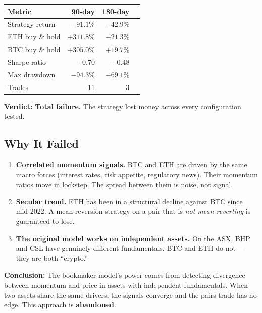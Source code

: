 \documentclass[11pt,a4paper]{article}
\begin{document}
\begin{tabular}{@{}lrrr@{}}
    \toprule
    \textbf{Metric} & \textbf{90-day} & \textbf{180-day} \\
    \midrule
    Strategy return    & $-91.1\%$  & $-42.9\%$  \\
    ETH buy \& hold    & $+311.8\%$ & $-21.3\%$  \\
    BTC buy \& hold    & $+305.0\%$ & $+19.7\%$  \\
    Sharpe ratio       & $-0.70$    & $-0.48$    \\
    Max drawdown       & $-94.3\%$  & $-69.1\%$  \\
    Trades             & 11         & 3          \\
    \bottomrule
\end{tabular}

\vspace{0.5em}

\textbf{Verdict: Total failure.} The strategy lost money across every
configuration tested.

\subsection{Why It Failed}

\begin{enumerate}[leftmargin=2em]
    \item \textbf{Correlated momentum signals.} BTC and ETH are driven
          by the same macro forces (interest rates, risk appetite,
          regulatory news). Their momentum ratios move in lockstep.
          The spread between them is noise, not signal.

    \item \textbf{Secular trend.} ETH has been in a structural decline
          against BTC since mid-2022. A mean-reversion strategy on a
          pair that is \emph{not mean-reverting} is guaranteed to lose.

    \item \textbf{The original model works on independent assets.}
          On the ASX, BHP and CSL have genuinely different fundamentals.
          BTC and ETH do not --- they are both ``crypto.''
\end{enumerate}

\textbf{Conclusion:} The bookmaker model's power comes from detecting
divergence between momentum and price in assets with independent
fundamentals. When two assets share the same drivers, the signals
converge and the pairs trade has no edge. This approach is
\textbf{abandoned}.
\end{document}
